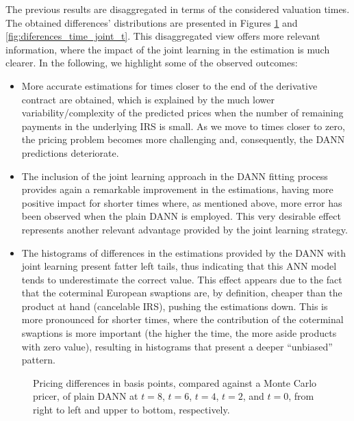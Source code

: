 		The previous results are disaggregated in terms of the considered valuation times. The obtained differences' distributions are presented in Figures \ref{fig:diferences_time_t} and \ref{fig:diferences_time_joint_t}.
		This disaggregated view offers more relevant information, where the impact of the joint learning in the estimation is much clearer. In the following, we highlight some of the observed outcomes:
		\begin{itemize}
			\item More accurate estimations for times closer to the end of the derivative contract are obtained, which is explained by the much lower variability/complexity of the predicted prices when the number of remaining payments in the underlying IRS is small. As we move to times closer to zero, the pricing problem becomes more challenging and, consequently, the DANN predictions deteriorate.

			\item The inclusion of the joint learning approach in the DANN fitting process provides again a remarkable improvement in the estimations, having more positive impact for shorter times where, as mentioned above, more error has been observed when the plain DANN is employed. This very desirable effect represents another relevant advantage provided by the joint learning strategy.

			\item The histograms of differences in the estimations provided by the DANN with joint learning present fatter left tails, thus indicating that this ANN model tends to underestimate the correct value. This effect appears due to the fact that the coterminal European swaptions are, by definition, cheaper than the product at hand (cancelable IRS), pushing the estimations down. This is more pronounced for shorter times, where the contribution of the coterminal swaptions is more important (the higher the time, the more aside products with zero value), resulting in histograms that present a deeper ``unbiased'' pattern.

		\end{itemize}
		\begin{figure}[h!]
			\centering
			\caption{Pricing differences in basis points, compared against a Monte Carlo pricer, of plain DANN at $t=8$, $t=6$, $t=4$, $t=2$, and $t=0$, from right to left and upper to bottom, respectively.}
			\label{fig:diferences_time_t}
		\end{figure}

